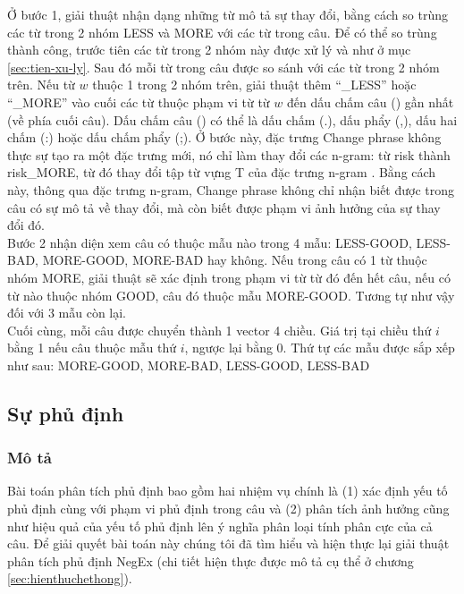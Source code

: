 Ở bước 1, giải thuật nhận dạng những từ mô tả sự thay đổi, bằng cách so trùng các từ trong 2 nhóm LESS và MORE với các từ trong câu. Để có thể so trùng thành công, trước tiên các từ trong 2 nhóm này được xử lý  và  như ở mục \ref{sec:tien-xu-ly}. Sau đó mỗi từ trong câu được so sánh với các từ trong 2 nhóm trên. Nếu từ $w$ thuộc 1 trong 2 nhóm trên, giải thuật thêm  ``\_LESS'' hoặc ``\_MORE'' vào cuối các từ thuộc phạm vi từ từ $w$ đến dấu chấm câu () gần nhất (về phía cuối câu). Dấu chấm câu () có thể là dấu chấm (.), dấu phẩy (,), dấu hai chấm (:) hoặc dấu chấm phẩy (;). Ở bước này, đặc trưng Change phrase không thực sự tạo ra một đặc trưng mới, nó chỉ làm thay đổi các n-gram: từ risk thành risk\_MORE, từ đó thay đổi tập từ vựng T của đặc trưng n-gram . Bằng cách này, thông qua đặc trưng n-gram, Change phrase không chỉ nhận biết được trong câu có sự mô tả về thay đổi, mà còn biết được phạm vi ảnh hưởng của sự thay đổi đó.\\

Bước 2 nhận diện xem câu có thuộc mẫu nào trong 4 mẫu: LESS-GOOD, LESS-BAD, MORE-GOOD, MORE-BAD hay không. Nếu trong câu có 1 từ thuộc nhóm MORE, giải thuật sẽ xác định trong phạm vi từ từ đó đến hết câu, nếu có từ nào thuộc nhóm GOOD, câu đó thuộc mẫu MORE-GOOD. Tương tự như vậy đối với 3 mẫu còn lại.\\

Cuối cùng, mỗi câu được chuyển thành 1 vector 4 chiều. Giá trị tại chiều thứ $i$ bằng 1 nếu câu thuộc mẫu thứ $i$, ngược lại bằng 0. Thứ tự các mẫu được sắp xếp như sau: MORE-GOOD, MORE-BAD, LESS-GOOD, LESS-BAD
\subsection{Sự phủ định} \label{sec:su-phu-dinh}
\subsubsection*{Mô tả}
Bài toán phân tích phủ định bao gồm hai nhiệm vụ chính là (1) xác định yếu tố phủ định cùng với phạm vi phủ định trong câu và (2) phân tích ảnh hưởng cũng như hiệu quả của yếu tố phủ định lên ý nghĩa phân loại tính phân cực của cả câu. Để giải quyết bài toán này chúng tôi đã tìm hiểu và hiện thực lại giải thuật phân tích phủ định NegEx\cite{Tanushi2013} (chi tiết hiện thực được mô tả cụ thể ở chương \ref{sec:hienthuchethong}).\\


